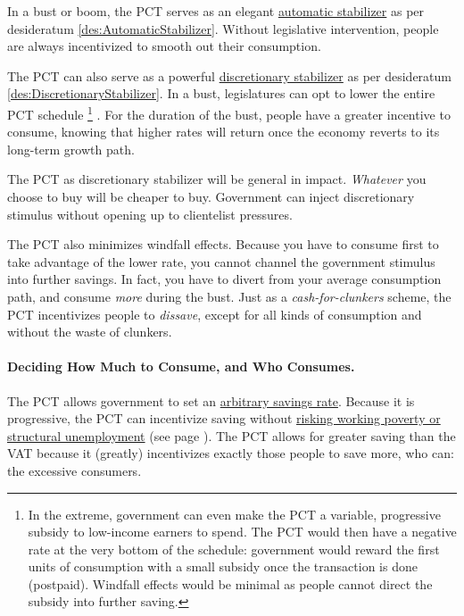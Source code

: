 
In a bust or boom, the PCT serves as an elegant \hyperref[des:AutomaticStabilizer]{automatic stabilizer} as per desideratum \ref{des:AutomaticStabilizer}.
Without legislative intervention, people are always incentivized to smooth out their consumption.

The PCT can also serve as a powerful \hyperref[des:DiscretionaryStabilizer]{discretionary stabilizer} as per desideratum \ref{des:DiscretionaryStabilizer}.
In a bust, legislatures can opt to lower the entire PCT schedule
\footnote{
	In the extreme, government can even make the PCT a variable, progressive subsidy to low-income earners to spend.
	The PCT would then have a negative rate at the very bottom of the schedule:
	government would reward the first units of consumption with a small subsidy once the transaction is done (postpaid).
	Windfall effects would be minimal as people cannot direct the subsidy into further saving.
}
.
For the duration of the bust, people have a greater incentive to consume, knowing that higher rates will return once the economy reverts to its long-term growth path.

The PCT as discretionary stabilizer will be general in impact.
\emph{Whatever} you choose to buy will be cheaper to buy.
Government can inject discretionary stimulus without opening up to clientelist pressures.

The PCT also minimizes windfall effects.
Because you have to consume first to take advantage of the lower rate, you cannot channel the government stimulus into further savings.
In fact, you have to divert from your average consumption path, and consume \emph{more} during the bust.
Just as a \emph{cash-for-clunkers} scheme, the PCT incentivizes people to \emph{dissave}, except for all kinds of consumption and without the waste of clunkers.

\paragraph{Deciding How Much to Consume, and Who Consumes.}
The PCT allows government to set an \hyperref[des:Savings]{arbitrary savings rate}.
Because it is progressive, the PCT can incentivize saving without \hyperref[des:LowPriceFloor]{risking working poverty or structural unemployment} (see page \pageref{des:LowPriceFloor}).
The PCT allows for greater saving than the VAT because it (greatly) incentivizes exactly those people to save more, who can:
the excessive consumers.

